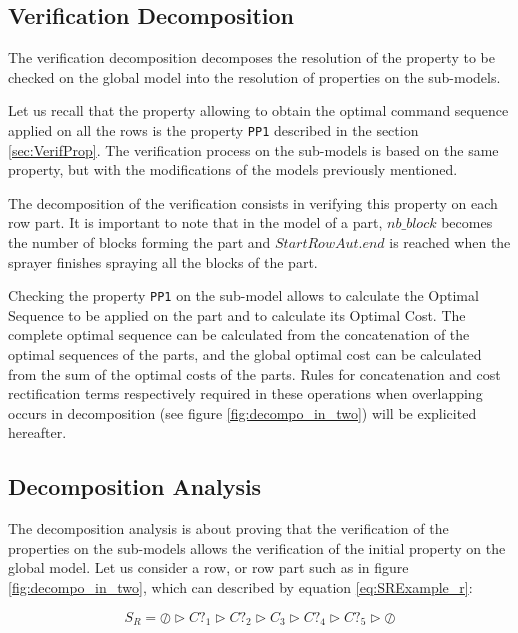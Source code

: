 \subsection{Verification Decomposition}
\label{VD}
The verification decomposition decomposes the resolution of the property to be checked on the global model into the resolution of properties on the sub-models.

Let us recall that the property allowing to obtain the optimal command sequence applied on all the rows is the property \texttt{PP1} 
described in the section \ref{sec:VerifProp}. The verification process on the sub-models is based on the same property, but with the modifications of the models previously mentioned.

The decomposition of the verification consists in verifying this property on each row part. It is important to note that in the model of a part, $ nb\_block $ becomes the number of blocks forming the part and $ StartRowAut.end $ is reached when the sprayer finishes spraying all the blocks of the part. 

Checking the property \texttt{PP1} on the sub-model allows to calculate the Optimal Sequence to be applied on the part and to calculate its Optimal Cost. 
The complete optimal sequence can be calculated from the concatenation of the optimal sequences of the parts, and the global optimal cost can be calculated from the sum of the optimal costs of the parts. Rules for concatenation and cost rectification terms respectively required in these operations when overlapping occurs in decomposition (see figure \ref{fig:decompo_in_two}) will be explicited hereafter.

\subsection{Decomposition Analysis}
\label{PreveComp}

The decomposition analysis is about proving that the verification of the properties on the sub-models allows the verification of the initial property on the global model.
Let us consider a row, or row part such as in figure \ref{fig:decompo_in_two}, which can described by equation \ref{eq:SRExample_r}:

\begin{equation}
	S_R = \oslash \triangleright C?_{1} \triangleright C?_{2} \triangleright C_{3} \triangleright C?_{4} \triangleright C?_{5} \triangleright \oslash \label{eq:SRExample_r}
\end{equation}


